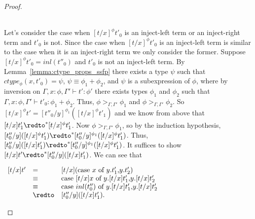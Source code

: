 \begin{proof}
\begin{itemize}
    \ \\
    Let's consider the case when $[t/x]^\phi t'_0$ is an inject-left term or an inject-right term and 
    $t'_0$ is not.  Since the case when $[t/x]^\phi t'_0$ is an inject-left term is similar to the case when
    it is an inject-right term we only consider the former.  Suppose $[t/x]^\phi t'_0 = inl(t''_0)$ and 
    $t'_0$ is not an inject-left term.  By Lemma~\ref{lemma:ctype_props_ssfp} there exists a type
    $\psi$ such that $ctype_\phi(x,t'_0) = \psi$, $\psi \equiv \phi_1+\phi_2$, and $\psi$ is a subexpression
    of $\phi$, where by inversion on $\Gamma,x:\phi,\Gamma' \vdash t':\phi'$ there exists types $\phi_1$ and
    $\phi_2$ such that $\Gamma,x:\phi,\Gamma' \vdash t'_0:\phi_1+\phi_2$.  Thus, $\phi >_{\Gamma,\Gamma'} \phi_1$
    and $\phi >_{\Gamma,\Gamma'} \phi_2$.  So $[t/x]^\phi t' = [t''_0/y]^{\phi_1} ([t/x]^{\phi} t'_1)$ and we know from above
    that $[t/x]t'_1 \redto^* [t/x]^{\phi} t'_1$.  Now $\phi >_{\Gamma,\Gamma'} \phi_1$, so by the induction
    hypothesis, $[t''_0/y]([t/x]^{\phi} t'_1) \redto^* [t''_0/y]^{\phi_1}([t/x]^\phi t'_1)$.  Thus,
    $[t''_0/y]([t/x] t'_1) \redto^* [t''_0/y]^{\phi_1}([t/x]^\phi t'_1)$.  It suffices to show 
    $ [t/x]t' \redto^* [t''_0/y]([t/x] t'_1)$.  We can see that 
    \begin{center}
      \begin{math}
        \begin{array}{lll}
          [t/x]t' & = & [t/x](\ccon{x}{y}{t'_1}{t'_2})\\
          & \equiv & \ccon{[t/x]x}{y}{[t/x]t'_1}{[t/x]t'_2}\\
          & \equiv & \ccon{inl(t''_0)}{y}{[t/x]t'_1}{[t/x]t'_2}\\
          & \redto & [t''_0/y]([t/x]t'_1).
        \end{array}
      \end{math}
    \end{center}
    

\end{itemize}
\end{proof}
